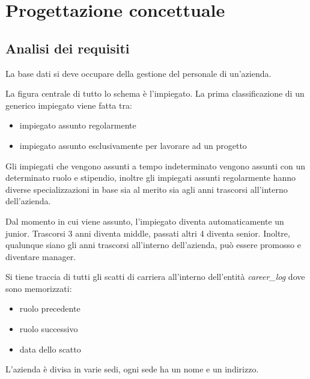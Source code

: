 \section{Progettazione concettuale}
\subsection{Analisi dei requisiti}
La base dati si deve occupare della gestione del personale di un'azienda.

La figura centrale di tutto lo schema è l'impiegato.\sskip
La prima classificazione di un generico impiegato viene fatta tra:
\begin{itemize}
	\item impiegato assunto regolarmente
	\item impiegato assunto esclusivamente per lavorare ad un progetto
\end{itemize}\medskip
Gli impiegati che vengono assunti a tempo indeterminato vengono assunti con un determinato ruolo e stipendio, inoltre gli impiegati assunti regolarmente hanno diverse specializzazioni in base sia al merito sia agli anni trascorsi all'interno dell'azienda.

Dal momento in cui viene assunto, l'impiegato diventa automaticamente un junior. Trascorsi 3 anni diventa middle, passati altri 4 diventa senior.
Inoltre, qualunque siano gli anni trascorsi all'interno dell'azienda, può essere promosso e diventare manager.

Si tiene traccia di tutti gli scatti di carriera all'interno dell'entità \textit{career\_log} dove sono memorizzati:
\begin{itemize}
	\item ruolo precedente
	\item ruolo successivo
	\item data dello scatto
\end{itemize}\medskip
L'azienda è divisa in varie sedi, ogni sede ha un nome e un indirizzo.


